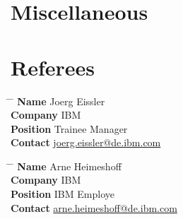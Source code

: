 \documentclass[10pt]{article} %
\begin{document}

\section{Miscellaneous}

\section{Referees}

\parbox{0.5\textwidth}{ %
\begin{tabbing}
\hspace{2.75cm} \= \hspace{4cm} \= \kill %
{\bf Name} \> Joerg Eissler \\ %
{\bf Company} \> IBM \\ %
{\bf Position} \> Trainee Manager \\ %
{\bf Contact} \> \href{mailto:joerg.eissler@de.ibm.com}{joerg.eissler@de.ibm.com} %
\end{tabbing}}
\hfill %
\parbox{0.5\textwidth}{ %
\begin{tabbing}
\hspace{2.75cm} \= \hspace{4cm} \= \kill %
{\bf Name} \> Arne Heimeshoff\\ %
{\bf Company} \> IBM \\ %
{\bf Position} \> IBM Employe \\ %
{\bf Contact} \> \href{mailto:arne.heimeshoff@de.ibm.com}{arne.heimeshoff@de.ibm.com} %
\end{tabbing}}

\end{document}
